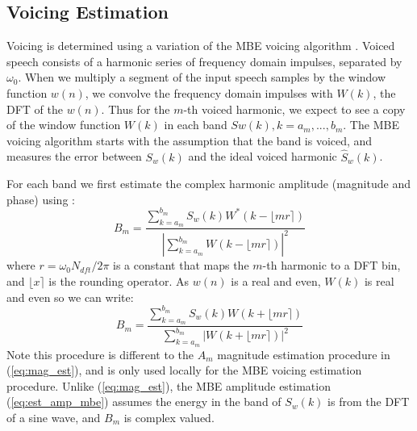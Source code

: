 \documentclass{article}
\begin{document}
{\subsection{Voicing Estimation}

Voicing is determined using a variation of the MBE voicing algorithm \cite{griffin1988multiband}.  Voiced speech consists of a harmonic series of frequency domain impulses, separated by $\omega_0$.  When we multiply a segment of the input speech samples by the window function $w(n)$, we convolve the frequency domain impulses with $W(k)$, the DFT of the $w(n)$.  Thus for the $m$-th voiced harmonic, we expect to see a copy of the window function $W(k)$ in each band $Sw(k), k=a_m,...,b_m$.  The MBE voicing algorithm starts with the assumption that the band is voiced, and measures the error between $S_w(k)$ and the ideal voiced harmonic $\hat{S}_w(k)$.

For each band we first estimate the complex harmonic amplitude (magnitude and phase) using \cite{griffin1988multiband}:
\begin{equation}
B_m = \frac{\sum_{k=a_m}^{b_m} S_w(k) W^* (k - \lfloor mr \rceil)}{|\sum_{k=a_m}^{b_m} W (k - \lfloor mr \rceil)|^2}
\end{equation}
where $r= \omega_0 N_{dft}/2 \pi$ is a constant that maps the $m$-th harmonic to a DFT bin, and $ \lfloor x \rceil$ is the rounding operator.  As $w(n)$ is a real and even, $W(k)$ is real and even so we can write:
\begin{equation}
\label{eq:est_amp_mbe}
B_m = \frac{\sum_{k=a_m}^{b_m} S_w(k) W (k + \lfloor mr \rceil)}{\sum_{k=a_m}^{b_m} |W (k + \lfloor mr \rceil)|^2}
\end{equation}
Note this procedure is different to the $A_m$ magnitude estimation procedure in (\ref{eq:mag_est}), and is only used locally for the MBE voicing estimation procedure.  Unlike (\ref{eq:mag_est}), the MBE amplitude estimation (\ref{eq:est_amp_mbe}) assumes the energy in the band of $S_w(k)$ is from the DFT of a sine wave, and $B_m$ is complex valued.

}
\end{document}
